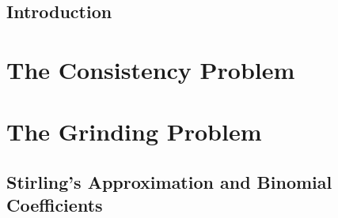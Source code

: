 \documentclass[11pt,oneside]{book}
\begin{document}

\singlespacing

\setcounter{tocdepth}{1}
\tableofcontents

\listoffigures

\listoftables

\thispagestyle{plain}
\mainmatter
\singlespacing



\chapter{Introduction}


\renewcommand{\PartPrefix}{multihonest}
\part{The Consistency Problem}\label{part:multihonest}


\renewcommand{\PartPrefix}{praos}
\part{The Grinding Problem}\label{part:praos}


% 



\singlespacing
\newpage
{}
  


\appendix
{}

\chapter{Stirling's Approximation and Binomial Coefficients}\label{app:binomial-coeff}


% 

% 
\end{document}
